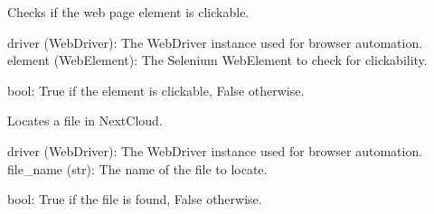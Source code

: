 \documentclass[letterpaper,10pt,english]{sphinxmanual}
\begin{document}

\begin{fulllineitems}
\label{\detokenize{utils:utils.file_management.is_element_clickable}}
\pysigstartsignatures
{}
\pysigstopsignatures
\sphinxAtStartPar
Checks if the web page element is clickable.
\begin{description}
\sphinxAtStartPar
driver (WebDriver): The WebDriver instance used for browser automation.
element (WebElement): The Selenium WebElement to check for clickability.

\sphinxAtStartPar
bool: True if the element is clickable, False otherwise.

\end{description}

\end{fulllineitems}


\begin{fulllineitems}
\label{\detokenize{utils:utils.file_management.locate_file_in_nextcloud}}
\pysigstartsignatures
{}
\pysigstopsignatures
\sphinxAtStartPar
Locates a file in NextCloud.
\begin{description}
\sphinxAtStartPar
driver (WebDriver): The WebDriver instance used for browser automation.
file\_name (str): The name of the file to locate.

\sphinxAtStartPar
bool: True if the file is found, False otherwise.

\end{description}

\end{fulllineitems}

\end{document}
